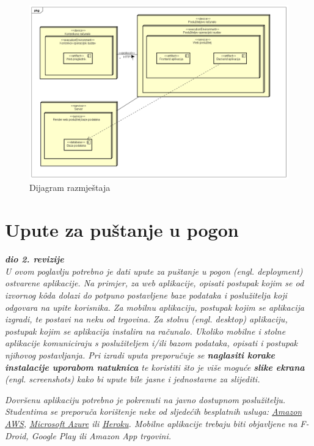 			\begin{figure}[H]
				\centering
				\includegraphics[width=1\textwidth]{slike/dijagrami/Dijagram razmjestaja.png}
				\caption{Dijagram razmještaja}
				\label{fig:enter-label}
			\end{figure}	

			\eject 
		
		\section{Upute za puštanje u pogon}
		
			\textbf{\textit{dio 2. revizije}}\\
		
			 \textit{U ovom poglavlju potrebno je dati upute za puštanje u pogon (engl. deployment) ostvarene aplikacije. Na primjer, za web aplikacije, opisati postupak kojim se od izvornog kôda dolazi do potpuno postavljene baze podataka i poslužitelja koji odgovara na upite korisnika. Za mobilnu aplikaciju, postupak kojim se aplikacija izgradi, te postavi na neku od trgovina. Za stolnu (engl. desktop) aplikaciju, postupak kojim se aplikacija instalira na računalo. Ukoliko mobilne i stolne aplikacije komuniciraju s poslužiteljem i/ili bazom podataka, opisati i postupak njihovog postavljanja. Pri izradi uputa preporučuje se \textbf{naglasiti korake instalacije uporabom natuknica} te koristiti što je više moguće \textbf{slike ekrana} (engl. screenshots) kako bi upute bile jasne i jednostavne za slijediti.}
			
			
			 \textit{Dovršenu aplikaciju potrebno je pokrenuti na javno dostupnom poslužitelju. Studentima se preporuča korištenje neke od sljedećih besplatnih usluga: \href{https://aws.amazon.com/}{Amazon AWS}, \href{https://azure.microsoft.com/en-us/}{Microsoft Azure} ili \href{https://www.heroku.com/}{Heroku}. Mobilne aplikacije trebaju biti objavljene na F-Droid, Google Play ili Amazon App trgovini.}
			
			
			\eject 